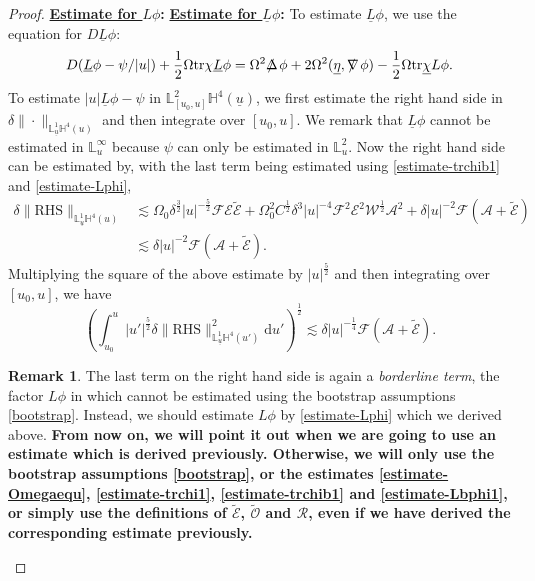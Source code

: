 \documentclass[11pt,reqno]{amsart}
\theoremstyle{definition}
\newtheorem{remark}{Remark}[section]
\numberwithin{equation}{section}
\newcommand{\D}{\mathrm{d}}
\newcommand{\tr}{\mathrm{tr}}
\renewcommand{\L}{\mathbb{L}}
\renewcommand{\H}{\mathbb{H}}
\def\chib{\underline{\chi}}
\def\etab{\underline{\eta}}
\def\Lb{\underline{L}}
\def\tr{\mathrm{tr}}
\def\ub{\underline{u}}
\def\nablas{\mbox{$\nabla \mkern -13mu /$ }}
\def\Deltas{\mbox{$\Delta \mkern -13mu /$ }}
\begin{document}
\begin{proof}  {\bf \underline{Estimate for $L\phi$}:}
{\bf \underline{Estimate for $\Lb\phi$}:} To estimate $\Lb\phi$, we use the equation for $D\Lb\phi$:
\begin{equation}\label{equ-Lbphi}D(\Lb\phi-\psi/|u|)+\frac{1}{2}\Omega\tr\chi\Lb\phi=\Omega^2\Deltas\phi+2\Omega^2(\etab,\nablas\phi)-\frac{1}{2}\Omega\tr\chib L\phi.\end{equation}
To estimate $|u|\Lb\phi-\psi$ in $\L^2_{[u_0,u]}\H^4(\ub)$, we first estimate the right hand side in $\delta\|\cdot\|_{\L^1_{\ub}\H^4(u)}$ and then integrate over $[u_0,u]$. We remark that $\Lb\phi$ cannot be estimated in $\L^\infty_{u}$ because $\psi$ can only be estimated in $\L^2_u$. Now the right hand side can be estimated by, with the last term being estimated using \eqref{estimate-trchib1} and \eqref{estimate-Lphi},
\begin{align*}
\delta\|\text{RHS}\|_{\L^1_{\ub}{\H^4(u)}}&\lesssim \Omega_0\delta^{\frac{3}{2}}|u|^{-\frac{5}{2}}\mathscr{F}\mathscr{E}\widetilde{\mathcal{E}}+\Omega_0^2C^{\frac{1}{2}}\delta^3|u|^{-4}\mathscr{F}^2\mathscr{E}^2\mathscr{W}^{\frac{1}{2}}\mathcal{A}^2+\delta|u|^{-2}\mathscr{F}(\mathcal{A}+\widetilde{\mathcal{E}})\\
&\lesssim \delta|u|^{-2}\mathscr{F}(\mathcal{A}+\widetilde{\mathcal{E}}).
\end{align*}
 Multiplying the square of the above estimate by $|u|^{\frac{5}{2}}$ and then integrating over $[u_0,u]$, we have
\begin{equation}\label{RHS-Lbphi}
\left(\int_{u_0}^u|u'|^{\frac{5}{2}}\delta\|\text{RHS}\|^2_{\L^1_{\ub}{\H^4(u')}}\D u'\right)^{\frac{1}{2}}\lesssim \delta|u|^{-\frac{1}{4}}\mathscr{F}(\mathcal{A}+\widetilde{\mathcal{E}}).
\end{equation}
\begin{remark}
The last term on the right hand side is again a \emph{borderline term}, the factor $L\phi$ in which cannot be estimated using the bootstrap assumptions \eqref{bootstrap}. Instead, we should estimate $L\phi$ by \eqref{estimate-Lphi} which we derived above. {\bf From now on, we will point it out when we are going to use an estimate which is derived previously. Otherwise, we will only use the bootstrap assumptions \eqref{bootstrap}, or the estimates \eqref{estimate-Omegaequ}, \eqref{estimate-trchi1}, \eqref{estimate-trchib1} and \eqref{estimate-Lbphi1}, or simply use the definitions of $\widetilde{\mathcal{E}}$, $\widetilde{\mathcal{O}}$ and $\mathcal{R}$, even if we have derived the corresponding estimate previously.}
\end{remark}



\end{proof}
\end{document}
